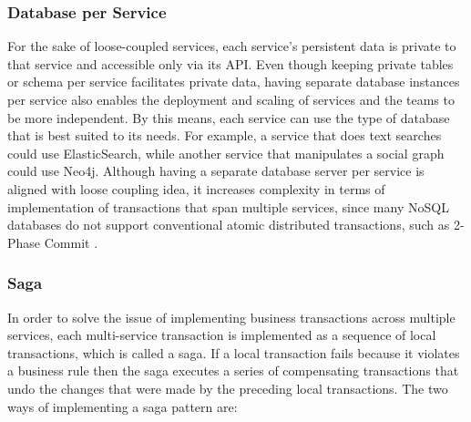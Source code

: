 \documentclass{Configuration_Files/PoliMi3i_thesis}
\begin{document}
\subsubsection{Database per Service}
\label{subsubsec:dps}

For the sake of loose-coupled services, each service’s persistent data is private to that service and accessible only via its API.
Even though keeping private tables or schema per service facilitates private data, having separate database instances per service also enables the deployment and scaling of services and the teams to be more independent.
By this means, each service can use the type of database that is best suited to its needs.
For example, a service that does text searches could use ElasticSearch, while
another service that manipulates a social graph could use Neo4j.
Although having a separate database server per service is aligned with loose coupling idea, it increases complexity in terms of implementation of transactions that span multiple services, since many NoSQL databases do not support conventional atomic distributed transactions, such as 2-Phase Commit \cite{twopc}.

\subsubsection{Saga}
\label{subsubsec:saga}

In order to solve the issue of implementing business transactions across multiple services, each multi-service transaction is implemented as a sequence of local transactions, which is called a saga.
If a local transaction fails because it violates a business rule then the saga executes a series of compensating transactions that undo the changes that were made by the preceding local transactions.
The two ways of implementing a saga pattern are:
\end{document}
